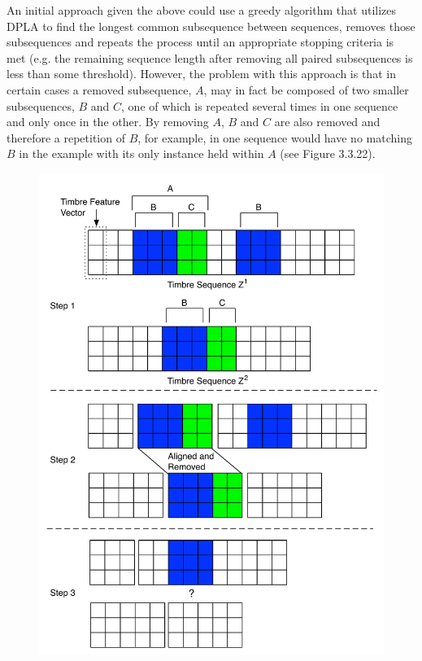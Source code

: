 \documentclass[a4paper,12pt]{report} 	%
\numberwithin{figure}{chapter}
\numberwithin{table}{chapter}
\numberwithin{equation}{chapter}
\begin{document}
\begin{flushleft}
An initial approach given the above could use a greedy algorithm that utilizes DPLA to find the longest common subsequence between sequences, removes those subsequences and repeats the process until an appropriate stopping criteria is met (e.g. the remaining sequence length after removing all paired subsequences is less than some threshold). However, the problem with this approach is that in certain cases a removed subsequence, $A$, may in fact be composed of two smaller subsequences, $B$ and $C$, one of which is repeated several times in one sequence and only once in the other. By removing $A$, $B$ and $C$ are also removed and therefore a repetition of $B$, for example, in one sequence would have no matching $B$ in the example with its only instance held within $A$ (see Figure 3.3.22).
\begin{figure}[!p]
\begin{center}
\includegraphics[scale=0.6]{GreedyMatching1}

\end{center}
\end{figure}
\end{flushleft}
\end{document}
